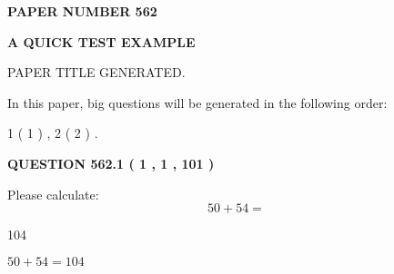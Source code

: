 \documentclass[12pt]{article}
\begin{document}
   
   
   
\newpage 
\setcounter{page}{ 
   562001 } 
   
   
   
   
 {\textbf{ \Large{ PAPER NUMBER  562  }}}
   
   
\vspace{0.2in}
   
   
   
   
   
   
   
   
 \vspace{0.2in}
{\LARGE {\textbf{ A QUICK TEST EXAMPLE}}}
   
   
 PAPER TITLE GENERATED.
   
   
   
\vspace{0.2in}
   
In this paper, big questions will be generated in the following order: 
   
   
   1 ( 1 )
 ,
   2 ( 2 )
 .
  
\vspace{0.2in}
  
{\textbf{\Large{QUESTION
562.1 
 ( 1 , 1 , 101 )
}}}
  
  
 
Please calculate:
\begin{equation}
50 +  %
54 = \nonumber
\end{equation}
 
 
 
\noindent{}
 
 

104
 
 
\noindent{}
 
 

 
 
 
\noindent{}
 
 

$ %
50 +  %
54=   %
104$
 
 
\noindent{}
 
 

 
   
\end{document}

